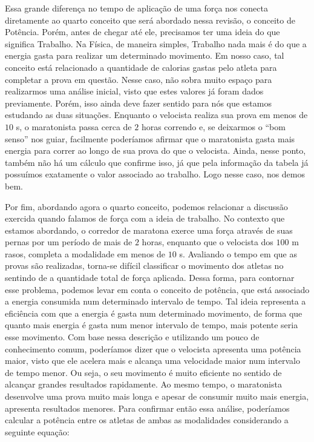 \begin{multicols}{2}
Essa grande diferença no tempo de aplicação de uma força nos conecta diretamente ao quarto conceito que será abordado nessa revisão, o conceito de Potência. Porém, antes de chegar até ele, precisamos ter uma ideia do que significa Trabalho. Na Física, de maneira simples, Trabalho nada mais é do que a energia gasta para realizar um determinado movimento. Em nosso caso, tal conceito está relacionado a quantidade de calorias gastas pelo atleta para completar a prova em questão. Nesse caso, não sobra muito espaço para realizarmos uma análise inicial, visto que estes valores já foram dados previamente. Porém, isso ainda deve fazer sentido para nós que estamos estudando as duas situações. Enquanto o velocista realiza sua prova em menos de $10$ s, o maratonista passa cerca de $2$ horas correndo e, se deixarmos o ``bom senso'' nos guiar, facilmente poderíamos afirmar que o maratonista gasta mais energia para correr ao longo de sua prova do que o velocista. Ainda, nesse ponto, também não há um cálculo que confirme isso, já que pela informação da tabela já possuímos exatamente o valor associado ao trabalho. Logo nesse caso, nos demos bem.

Por fim, abordando agora o quarto conceito, podemos relacionar a discussão exercida quando falamos de força com a ideia de trabalho. No contexto que estamos abordando, o corredor de maratona exerce uma força através de suas pernas por um período de mais de $2$ horas, enquanto que o velocista dos $100$ m rasos, completa a modalidade em menos de $10$ s. Avaliando o tempo em que as provas são realizadas, torna-se difícil classificar o movimento dos atletas no sentindo de a quantidade total de força aplicada. Dessa forma, para contornar esse problema, podemos levar em conta o conceito de potência, que está associado a energia consumida num determinado intervalo de tempo. Tal ideia representa a eficiência com que a energia é gasta num determinado movimento, de forma que quanto mais energia é gasta num menor intervalo de tempo, mais potente seria esse movimento. Com base nessa descrição e utilizando um pouco de conhecimento comum, poderíamos dizer que o velocista apresenta uma potência maior, visto que ele acelera mais e alcança uma velocidade maior num intervalo de tempo menor. Ou seja, o seu movimento é muito eficiente no sentido de alcançar grandes resultados rapidamente. Ao mesmo tempo, o maratonista desenvolve uma prova muito mais longa e apesar de consumir muito mais energia, apresenta resultados menores. Para confirmar então essa análise, poderíamos calcular a potência entre os atletas de ambas as modalidades considerando a seguinte equação:


\end{multicols}
